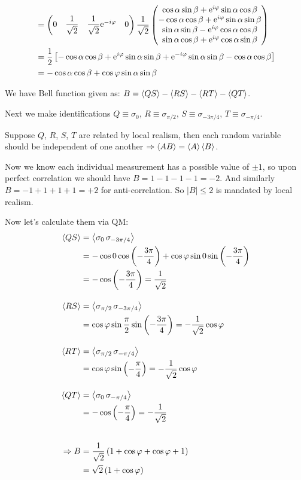 \begin{parts}
\begin{align*}
		&= \begin{pmatrix}
			0 & \dfrac{1}{\sqrt{2}} & \dfrac{1}{\sqrt{2}} \mathrm{e}^{-i\varphi} & 0
		\end{pmatrix}
		\frac{1}{\sqrt{2}}
		\begin{pmatrix}
			\cos\alpha \sin\beta + \mathrm{e}^{i\varphi} \sin\alpha \cos\beta \\
			-\cos\alpha \cos\beta + \mathrm{e}^{i\varphi} \sin\alpha \sin\beta \\
			\sin\alpha \sin\beta - \mathrm{e}^{i\varphi} \cos\alpha \cos\beta \\
			\sin\alpha \cos\beta + \mathrm{e}^{i\varphi} \cos\alpha \sin\beta
		\end{pmatrix} \\
		&= \frac{1}{2} \left[-\cos\alpha \cos\beta + \mathrm{e}^{i\varphi} \sin\alpha \sin\beta + \mathrm{e}^{-i\varphi} \sin\alpha \sin\beta - \cos\alpha \cos\beta\right] \\
		&= -\cos\alpha \cos\beta + \cos\varphi \sin\alpha \sin\beta
	\end{align*}
	
	We have Bell function given as: $B = \left\langle{}QS{}\right\rangle - \left\langle{}RS{}\right\rangle - \left\langle{}RT{}\right\rangle - \left\langle{}QT{}\right\rangle$.
	
	Next we make identifications $Q \equiv \sigma_0$, $R \equiv \sigma_{\pi/2}$, $S \equiv \sigma_{-3\pi/4}$, $T \equiv \sigma_{-\pi/4}$.
	
	Suppose $Q$, $R$, $S$, $T$ are related by local realism, then each random variable should be independent of one another $\Rightarrow \left\langle{}AB{}\right\rangle = \left\langle{}A{}\right\rangle \left\langle{}B{}\right\rangle$.
	
	Now we know each individual measurement has a possible value of $\pm 1$, so upon perfect correlation we should have $B = 1-1-1-1 = -2$.
	And similarly $B = -1+1+1+1 = +2$ for anti-correlation.
	So $|B| \leq 2$ is mandated by local realism.
	
	Now let's calculate them via QM:
	\begin{align*}
		\left\langle{}QS{}\right\rangle &= \left\langle{}\sigma_0 \, \sigma_{-3\pi/4}{}\right\rangle \\
		&= -\cos 0 \cos \left(-\frac{3\pi}{4}\right) + \cos\varphi \sin 0 \sin \left(-\frac{3\pi}{4}\right) \\
		&= -\cos\left(-\frac{3\pi}{4}\right) = \frac{1}{\sqrt{2}} \\[1em]
		\left\langle{}RS{}\right\rangle &= \left\langle{}\sigma_{\pi/2} \, \sigma_{-3\pi/4}{}\right\rangle \\
		&= \cos\varphi \sin\frac{\pi}{2} \sin\left(-\frac{3\pi}{4}\right) = -\frac{1}{\sqrt{2}} \cos\varphi \\[1em]
		\left\langle{}RT{}\right\rangle &= \left\langle{}\sigma_{\pi/2} \, \sigma_{-\pi/4}{}\right\rangle \\
		&= \cos\varphi \sin\left(-\frac{\pi}{4}\right) = -\frac{1}{\sqrt{2}} \cos\varphi \\[1em]
		\left\langle{}QT{}\right\rangle &= \left\langle{}\sigma_{0} \, \sigma_{-\pi/4}{}\right\rangle \\
		&= -\cos\left(-\frac{\pi}{4}\right) = -\frac{1}{\sqrt{2}} \\[2em]
		\Rightarrow B &= \frac{1}{\sqrt{2}} \left(1 + \cos\varphi + \cos\varphi + 1\right) \\
		&= \sqrt{2} \left(1 + \cos\varphi\right)
	\end{align*}
	

\end{parts}
